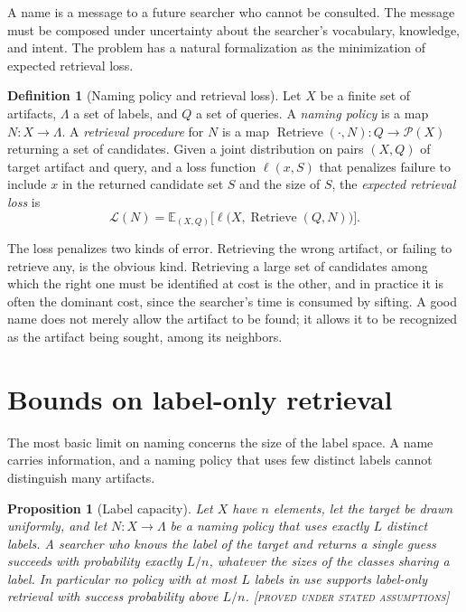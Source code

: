 \documentclass[11pt,twoside,openright]{book}
\theoremstyle{plain}
\newtheorem{proposition}[theorem]{Proposition}
\theoremstyle{definition}
\newtheorem{definition}[theorem]{Definition}
\theoremstyle{remark}
\newcommand{\Proved}{\textup{\textsc{[proved under stated assumptions]}}}
\newcommand{\Pow}{\mathcal{P}}
\newcommand{\E}{\mathbb{E}}
\begin{document}
A name is a message to a future searcher who cannot be consulted. The message must be composed under uncertainty about the searcher's vocabulary, knowledge, and intent. The problem has a natural formalization as the minimization of expected retrieval loss.

\begin{definition}[Naming policy and retrieval loss]\label{def:namingpolicy}
Let $X$ be a finite set of artifacts, $\Lambda$ a set of labels, and $Q$ a set of queries. A \emph{naming policy} is a map $N:X\to\Lambda$. A \emph{retrieval procedure} for $N$ is a map $\operatorname{Retrieve}(\cdot,N):Q\to\Pow(X)$ returning a set of candidates. Given a joint distribution on pairs $(X,Q)$ of target artifact and query, and a loss function $\ell(x,S)$ that penalizes failure to include $x$ in the returned candidate set $S$ and the size of $S$, the \emph{expected retrieval loss} is
\[
\mathcal{L}(N)=\E_{(X,Q)}\bigl[\ell\bigl(X,\operatorname{Retrieve}(Q,N)\bigr)\bigr].
\]
\end{definition}

The loss penalizes two kinds of error. Retrieving the wrong artifact, or failing to retrieve any, is the obvious kind. Retrieving a large set of candidates among which the right one must be identified at cost is the other, and in practice it is often the dominant cost, since the searcher's time is consumed by sifting. A good name does not merely allow the artifact to be found; it allows it to be recognized as the artifact being sought, among its neighbors.

\section{Bounds on label-only retrieval}

The most basic limit on naming concerns the size of the label space. A name carries information, and a naming policy that uses few distinct labels cannot distinguish many artifacts.

\begin{proposition}[Label capacity]\label{prop:labelcap}
Let $X$ have $n$ elements, let the target be drawn uniformly, and let $N:X\to\Lambda$ be a naming policy that uses exactly $L$ distinct labels. A searcher who knows the label of the target and returns a single guess succeeds with probability exactly $L/n$, whatever the sizes of the classes sharing a label. In particular no policy with at most $L$ labels in use supports label-only retrieval with success probability above $L/n$.
\Proved{}
\end{proposition}
\end{document}
